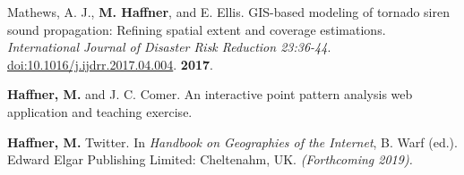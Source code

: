 \begin{cventries}
   \cventry
      {}
      {}
      {}
      {}
      {
        \begin{cvitems}
          \vspace{-4mm}
        \item {Mathews, A. J., \textbf{M. Haffner}, and E. Ellis. GIS-based modeling
            of tornado siren sound propagation: Refining spatial extent and
            coverage estimations. \textit{International Journal of Disaster Risk
              Reduction 23:36-44}.
            \href{https://doi.org/10.1016/j.ijdrr.2017.04.004}{doi:10.1016/j.ijdrr.2017.04.004}.}
          \textbf{2017}.\\
          \vspace{-2mm}
        \end{cvitems}
    }

\end{cventries}



\begin{cventries}
   \cventry
      {}
      {}
      {}
      {}
      {
        \begin{cvitems}
          \vspace{-4mm}
        \item
          {\textbf{Haffner, M.} and J. C. Comer.
            An interactive point pattern analysis web application and teaching
            exercise.} \\
          \vspace{-2mm}
        \end{cvitems}
    }

\end{cventries}



\begin{cventries}
   \cventry
      {}
      {}
      {}
      {}
      {
        \begin{cvitems}
          \vspace{-4mm}
        \item {\textbf{Haffner, M.} Twitter. In \textit{Handbook on Geographies
              of the Internet}, B. Warf (ed.). Edward Elgar Publishing Limited:
            Cheltenahm, UK. \textit{(Forthcoming 2019).}} \vspace{-2mm}
        \end{cvitems}
    }

\end{cventries}

